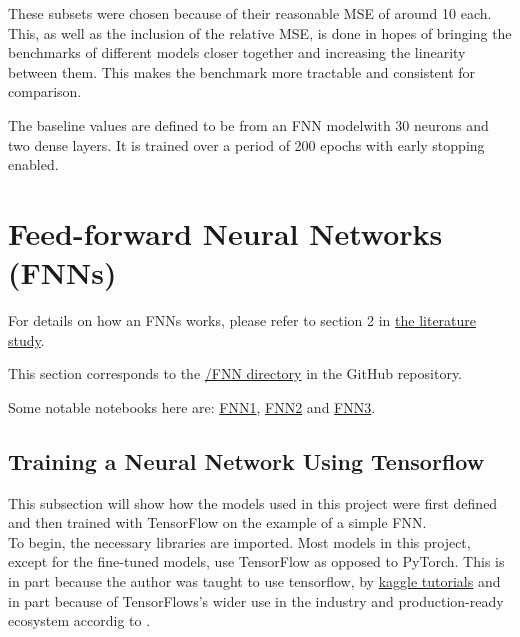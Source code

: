 \documentclass{article}
\begin{document}
These subsets were chosen because of their reasonable MSE of around 10 each.
\\[1em]
This, as well as the inclusion of the relative MSE, is done in hopes of bringing the benchmarks of different models closer together and increasing the linearity between them. This makes the benchmark more tractable and consistent for comparison.

The baseline values are defined to be from an FNN model\footnotemark with 30 neurons and two dense layers. It is trained over a period of 200 epochs with early stopping enabled.


\section{Feed-forward Neural Networks (FNNs)}
For details on how an FNNs works, please refer to section 2 in \href{https://github.com/AntonStantan/matura/blob/main/zwischenProdukt/LiteraturstudieAnton.pdf}{the literature study}.

This section corresponds to the \href{https://github.com/AntonStantan/matura/tree/main/FNN}{/FNN directory} in the GitHub repository.

Some notable notebooks here are: \href{https://github.com/AntonStantan/matura/blob/main/FNN/FNN1.ipynb}{FNN1}, \href{https://github.com/AntonStantan/matura/blob/main/FNN/FNN2.ipynb}{FNN2} and \href{https://github.com/AntonStantan/matura/blob/main/FNN/FNN3.ipynb}{FNN3}.


\subsection{Training a Neural Network Using Tensorflow}
This subsection will show how the models used in this project were first defined and then trained with TensorFlow on the example of a simple FNN.
\\[1.5em]
To begin, the necessary libraries are imported. Most models in this project, except for the fine-tuned models, use TensorFlow as opposed to PyTorch. 
This is in part because the author was taught to use tensorflow, by \href{https://www.kaggle.com/learn/intermediate-machine-learning}{kaggle tutorials} and in part because of TensorFlows's wider use in the industry and production-ready ecosystem accordig to \cite{alawi2025comparativesurveypytorchvs}.
\end{document}
